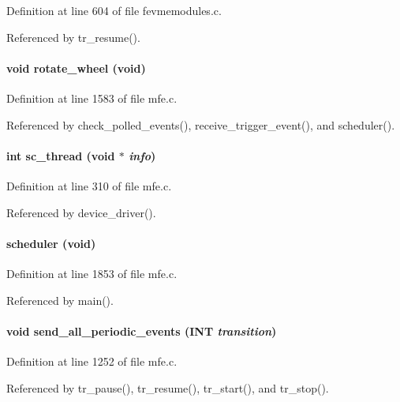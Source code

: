 Definition at line 604 of file fevmemodules.c.

Referenced by tr\_\-resume().
\paragraph[{rotate\_\-wheel}]{\setlength{\rightskip}{0pt plus 5cm}void rotate\_\-wheel (void)}\hfill\label{mfe_8c_abb411e407679b5b38f424cc2f9f86b07}


Definition at line 1583 of file mfe.c.

Referenced by check\_\-polled\_\-events(), receive\_\-trigger\_\-event(), and scheduler().
\paragraph[{sc\_\-thread}]{\setlength{\rightskip}{0pt plus 5cm}int sc\_\-thread (void $\ast$ {\em info})}\hfill\label{mfe_8c_ac5da75a0713cdecd2f46a7301b31c0c4}


Definition at line 310 of file mfe.c.

Referenced by device\_\-driver().
\paragraph[{scheduler}]{ scheduler (void)}\hfill\label{mfe_8c_a94c9987508c91ae4827cc231f43b577e}


Definition at line 1853 of file mfe.c.

Referenced by main().
\paragraph[{send\_\-all\_\-periodic\_\-events}]{\setlength{\rightskip}{0pt plus 5cm}void send\_\-all\_\-periodic\_\-events ({\bf INT} {\em transition})}\hfill\label{mfe_8c_a3b6c3bbe0dd40506673ff86ca13ebf5b}


Definition at line 1252 of file mfe.c.

Referenced by tr\_\-pause(), tr\_\-resume(), tr\_\-start(), and tr\_\-stop().
